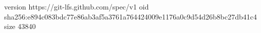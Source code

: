 version https://git-lfs.github.com/spec/v1
oid sha256:e894c083bdc77e86ab3af5a3761a764424009e1176a0c9d54d26b8bc27db41c4
size 43840

